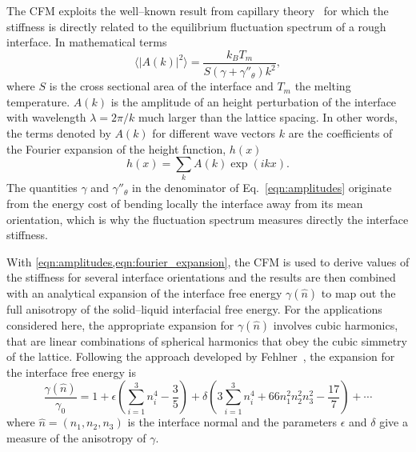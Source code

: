 The CFM exploits the well--known result from capillary theory~\cite{Karma1993} for which the stiffness is directly related to the equilibrium fluctuation spectrum of a rough interface. In mathematical terms
\begin{equation}
    \langle \lvert A(k) \rvert^2 \rangle = \frac{k_B T_m}{S (\gamma + \gamma''_{\theta})k^2},
    \label{eqn:amplitudes}
\end{equation}
where $S$ is the cross sectional area of the interface and $T_m$ the melting temperature. $A(k)$ is the amplitude of an height perturbation of the interface with wavelength $\lambda=2\pi/k$ much larger than the lattice spacing. In other words, the terms denoted by $A(k)$ for different wave vectors $k$ are the coefficients of the Fourier expansion of the height function, $h(x)$
\begin{equation}
    h(x)= \sum_k A(k) \exp{(i k x)}.
    \label{eqn:fourier_expansion}
\end{equation}
The quantities $\gamma$ and $\gamma''_{\theta}$ in the denominator of Eq.~\ref{eqn:amplitudes} originate from the energy cost of bending locally the interface away from its mean orientation, which is why the fluctuation spectrum measures directly the interface stiffness.


With \cref{eqn:amplitudes,eqn:fourier_expansion}, the CFM is used to derive values of the stiffness for several interface orientations and the results are then combined with an analytical expansion of the interface free energy $\gamma(\hat{n})$ to map out the full anisotropy of the solid--liquid interfacial free energy. For the applications considered here, the appropriate expansion for $\gamma(\hat{n})$ involves cubic harmonics, that are linear combinations of spherical harmonics that obey the cubic simmetry of the lattice. Following the approach developed by Fehlner~\cite{Fehlner1976}, the expansion for the interface free energy is
\begin{equation}
\label{eqn:cubic_harmonics}
    \frac{\gamma(\hat{n})}{\gamma_0} = 1 + \epsilon \left( \sum_{i=1}^3 n_i^4-\frac{3}{5}\right) + \delta \left( 3 \sum_{i=1}^3 n_i^{4}+ 66 n_1^2 n_2^2 n_3^2- \frac{17}{7}\right)+\cdots
\end{equation}
where $\hat{n}=(n_1,n_2,n_3)$ is the interface normal and the parameters $\epsilon$ and $\delta$ give a measure of the anisotropy of $\gamma$.

